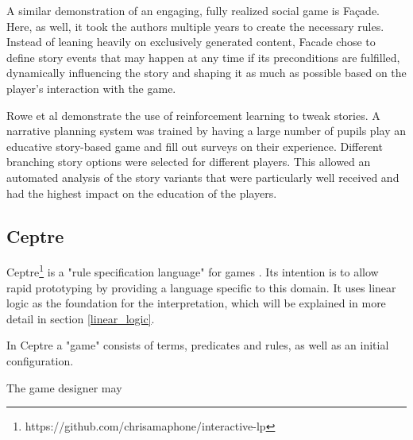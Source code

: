 A similar demonstration of an engaging, fully realized social game is Façade.
Here, as well, it took the authors multiple years to create the necessary rules.
Instead of leaning heavily on exclusively generated content, Facade chose to define story events that may happen at any time if its preconditions are fulfilled, dynamically influencing the story and shaping it as much as possible based on the player's interaction with the game.

Rowe et al demonstrate the use of reinforcement learning to tweak stories.
A narrative planning system was trained by having a large number of pupils play an educative story-based game and fill out surveys on their experience.
Different branching story options were selected for different players.
This allowed an automated analysis of the story variants that were particularly well received and had the highest impact on the education of the players.

\subsection{Ceptre} 

Ceptre\footnote{https://github.com/chrisamaphone/interactive-lp} is a "rule specification language" for games \cite{martens_2015}.
Its intention is to allow rapid prototyping by providing a language specific to this domain.
It uses linear logic as the foundation for the interpretation, which will be explained in more detail in section \ref{linear_logic}.

In Ceptre a "game" consists of terms, predicates and rules, as well as an initial configuration.

The game designer may 
